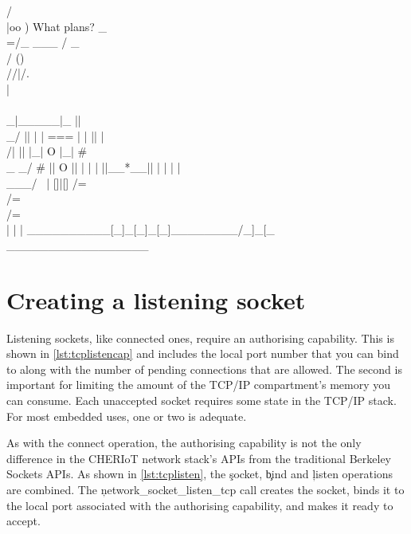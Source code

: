 \begin{console}
                               /~\\                   
                              |oo )       What plans? 
                              _\\=/_                  
              ___            /  _  \\                 
             / ()\\          //|/.\\|\\\\                
           _|_____|_       ||  \\_/  ||               
          | | === | |      || |\\ /| ||               
          |_|  O  |_|      #  \\_ _/ #                
           ||  O  ||          | | |                   
           ||__*__||          | | |                   
          |~ \\___/ ~|         []|[]                  
          /=\\ /=\\ /=\\         | | |                  
__________[_]_[_]_[_]________/_]_[_\\_________________
\end{console}


\section{Creating a listening socket}

Listening sockets, like connected ones, require an authorising capability.
This is shown in \ref{lst:tcplistencap} and includes the local port number that you can bind to along with the number of pending connections that are allowed.
The second is important for limiting the amount of the TCP/IP compartment's memory you can consume.
Each unaccepted socket requires some state in the TCP/IP stack.
For most embedded uses, one or two is adequate.

\codelisting[filename=examples/tcp_echo_server/tcp.cc,marker=server_capability,label=lst:tcplistencap,caption="A static capability that authorises binding to a local port."]{}

As with the connect operation, the authorising capability is not the only difference in the CHERIoT network stack's APIs from the traditional Berkeley Sockets APIs.
As shown in \ref{lst:tcplisten}, the \c{socket}, \c{bind} and \c{listen} operations are combined.
The \c{network_socket_listen_tcp} call creates the socket, binds it to the local port associated with the authorising capability, and makes it ready to accept.

